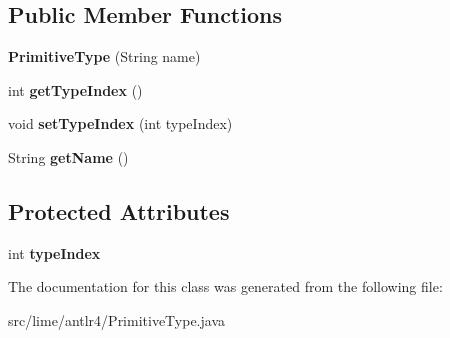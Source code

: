 \subsection*{Public Member Functions}
\begin{DoxyCompactItemize}
\item 
\mbox{\label{classlime_1_1antlr4_1_1PrimitiveType_aee03611ee38ae98eb5b7399a66c2c45f}} 
{\bfseries Primitive\+Type} (String name)
\item 
\mbox{\label{classlime_1_1antlr4_1_1PrimitiveType_af9a41e3f2334f1351767ad7a9cd5a13b}} 
int {\bfseries get\+Type\+Index} ()
\item 
\mbox{\label{classlime_1_1antlr4_1_1PrimitiveType_a9b2a3b3ef9d73c1dec2d19c3dfe922b4}} 
void {\bfseries set\+Type\+Index} (int type\+Index)
\item 
\mbox{\label{classlime_1_1antlr4_1_1PrimitiveType_a0ed087b1514f4926ee1b2c8e6b98be7d}} 
String {\bfseries get\+Name} ()
\end{DoxyCompactItemize}
\subsection*{Protected Attributes}
\begin{DoxyCompactItemize}
\item 
\mbox{\label{classlime_1_1antlr4_1_1PrimitiveType_a78bcb81ffb77ba561fd312bc9a80bc01}} 
int {\bfseries type\+Index}
\end{DoxyCompactItemize}


The documentation for this class was generated from the following file\+:\begin{DoxyCompactItemize}
\item 
src/lime/antlr4/Primitive\+Type.\+java\end{DoxyCompactItemize}
